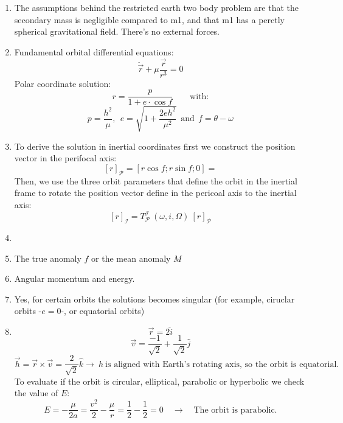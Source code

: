 \documentclass[a4paper]{article}
\begin{document}
\begin{enumerate}[label=\emph{\alph*)}]
  \item %
    The assumptions behind the restricted earth two body problem are that the secondary mass is negligible compared to m1, and that m1 has a perctly spherical gravitational field. There's no external forces.

  \item %
    Fundamental orbital differential equations:
    \[\ddot{\vec{r}}+\mu\frac{\vec{r}}{r^3}=0\]
    Polar coordinate solution:
    \[r = \frac{p}{1+e\cdot\cos{f}} \qquad \textrm{with:}\]
    \[p = \frac{h^2}{\mu},~~ e=\sqrt{1+\frac{2e h^2}{\mu^2}} ~~ \textrm{and} ~~ f=\theta-\omega\]
    
  \item %
    To derive the solution in inertial coordinates first we construct the position vector in the perifocal axis:
    \[[r]_{\mathscr{P}}=[r\cos{f};r\sin{f};0] = \]
    Then, we use the three orbit parameters that define the orbit in the inertial frame to rotate the position vector define in the pericoal axis to the inertial axis:
    \[ [r]_{\mathscr{I}} =T_{\mathscr{P}}^{\mathscr{I}}~(\omega,i,\Omega) ~[r]_{\mathscr{P}}\] 
  
  \item %

    
  \item %
    The true anomaly $f$  or the mean anomaly $M$
    
  \item %
    Angular momentum and energy.
    
  \item %
    Yes, for certain orbits the solutions becomes singular (for example, ciruclar orbits -$e=0$-, or equatorial orbits)
   
  \item %
    \[\vec{r} = 2 \hat{i}\]
    \[\vec{v} = \frac{-1}{\sqrt{2}}+\frac{1}{\sqrt{2}}\hat{j}\]
    \[\vec{h} = \vec{r} \times \vec{v}= \frac{2}{\sqrt{2}}\hat{k} \rightarrow ~ h ~ \textrm{is aligned with Earth's rotating axis, so the orbit is equatorial.}\]
    To evaluate if the orbit is circular, elliptical, parabolic or hyperbolic we check the value of $E$:
    \[E = -\frac{\mu}{2a} = \frac{v^2}{2}-\frac{\mu}{r} = \frac{1}{2} - \frac{1}{2} = 0 \quad \rightarrow \quad \textrm{The orbit is parabolic.}\]

\end{enumerate}
\end{document}

